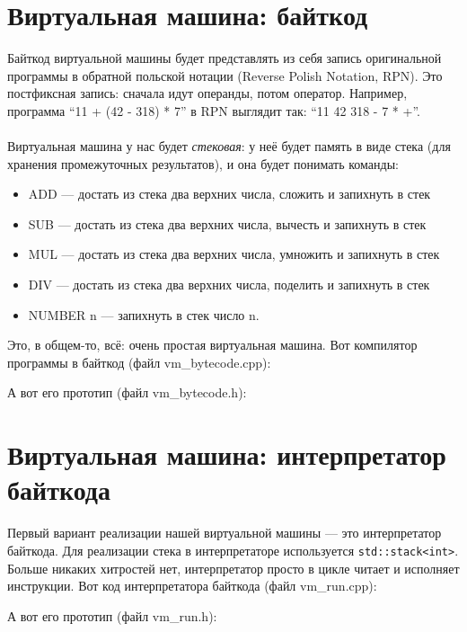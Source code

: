 \documentclass[11pt]{book}
\begin{document}
\section{Виртуальная машина: байткод}
Байткод виртуальной машины будет представлять из себя
запись оригинальной программы в обратной польской нотации (Reverse Polish Notation, RPN).
Это постфиксная запись: сначала идут операнды, потом оператор.
Например, программа ``11 + (42 - 318) * 7'' в RPN выглядит так: ``11 42 318 - 7 * +''.
\\ \\
Виртуальная машина у нас будет \emph{стековая}: у неё будет память в виде стека
(для хранения промежуточных результатов), и она будет понимать команды:
\begin{itemize}
\item ADD --- достать из стека два верхних числа, сложить и запихнуть в стек
\item SUB --- достать из стека два верхних числа, вычесть и запихнуть в стек
\item MUL --- достать из стека два верхних числа, умножить и запихнуть в стек
\item DIV --- достать из стека два верхних числа, поделить и запихнуть в стек
\item NUMBER n --- запихнуть в стек число n.
\end{itemize}
Это, в общем-то, всё: очень простая виртуальная машина.
Вот компилятор программы в байткод (файл vm\_bytecode.cpp):

А вот его прототип (файл vm\_bytecode.h):


\section{Виртуальная машина: интерпретатор байткода}
Первый вариант реализации нашей виртуальной машины --- это интерпретатор байткода.
Для реализации стека в интерпретаторе используется \texttt{std::stack<int>}.
Больше никаких хитростей нет, интерпретатор просто в цикле читает и исполняет инструкции.
Вот код интерпретатора байткода (файл vm\_run.cpp):

А вот его прототип (файл vm\_run.h):

\end{document}
